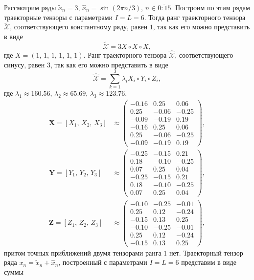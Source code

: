 \documentclass[specialist,
  substylefile=spbu.rtx,
subf,href,colorlinks=true, 12pt]{disser}
\theoremstyle{plain}
\theoremstyle{definition}
\theoremstyle{remark}
\begin{document}
Рассмотрим ряды $\tilde{x}_n=3,\, \hat{x}_n=\sin(2\pi n / 3)$, $n \in \overline{0:15}$.
Построим по этим рядам траекторные тензоры с параметрами $I=L=6$.
Тогда ранг траекторного тензора $\tilde{\mathcal{X}}$, соответствующего константному ряду, равен $1$, так как его
можно представить в виде
\[
  \tilde{\mathcal{X}} = 3 X\circ X \circ X,
\]
где $X=(1,\, 1,\, 1,\, 1,\, 1,\, 1)$.
Ранг траекторного тензора $\hat{\mathcal{X}}$, соответствующего синусу, равен $3$, так как его можно представить в виде
\[
  \hat{\mathcal{X}}=\sum_{k=1}^{3}\lambda_i X_i \circ Y_i\circ Z_i,
\]
где $\lambda_1 \approx 160.56$, $\lambda_2 \approx 65.69$, $\lambda_3 \approx 123.76$,
\begin{align*}
  \mathbf{X}=[X_1,\, X_2,\, X_3] & \approx
  \begin{pmatrix}
    -0.16 & 0.25  & 0.06  \\
    0.25  & -0.06 & -0.25 \\
    -0.09 & -0.19 & 0.19  \\
    -0.16 & 0.25  & 0.06  \\
    0.25  & -0.06 & -0.25 \\
    -0.09 & -0.19 & 0.19
  \end{pmatrix},\\
  \mathbf{Y}=[Y_1,\, Y_2,\, Y_3] & \approx
  \begin{pmatrix}
    -0.25 & -0.15 & 0.21  \\
    0.18  & -0.10 & -0.25 \\
    0.07  & 0.25  & 0.04  \\
    -0.25 & -0.15 & 0.21  \\
    0.18  & -0.10 & -0.25 \\
    0.07  & 0.25  & 0.04
  \end{pmatrix},\\
  \mathbf{Z}=[Z_1,\, Z_2,\, Z_3] & \approx
  \begin{pmatrix}
    -0.10 & -0.25 & -0.01 \\
    0.25  & 0.12  & -0.24 \\
    -0.15 & 0.13  & 0.25  \\
    -0.10 & -0.25 & -0.01 \\
    0.25  & 0.12  & -0.24 \\
    -0.15 & 0.13  & 0.25
  \end{pmatrix},
\end{align*}
притом точных приближений двумя тензорами ранга $1$ нет.
Траекторный тензор ряда $x_n=\tilde{x}_n+\hat{x}_n$, построенный с параметрами $I=L=6$ представим в виде суммы
\end{document}
